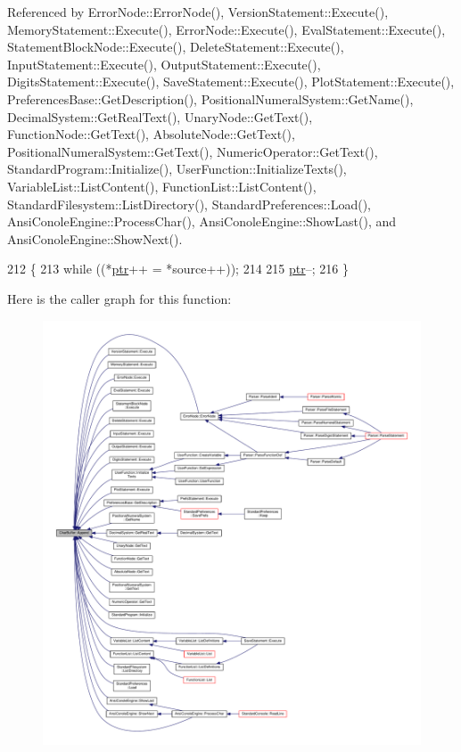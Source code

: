 Referenced by Error\+Node\+::\+Error\+Node(), Version\+Statement\+::\+Execute(), Memory\+Statement\+::\+Execute(), Error\+Node\+::\+Execute(), Eval\+Statement\+::\+Execute(), Statement\+Block\+Node\+::\+Execute(), Delete\+Statement\+::\+Execute(), Input\+Statement\+::\+Execute(), Output\+Statement\+::\+Execute(), Digits\+Statement\+::\+Execute(), Save\+Statement\+::\+Execute(), Plot\+Statement\+::\+Execute(), Preferences\+Base\+::\+Get\+Description(), Positional\+Numeral\+System\+::\+Get\+Name(), Decimal\+System\+::\+Get\+Real\+Text(), Unary\+Node\+::\+Get\+Text(), Function\+Node\+::\+Get\+Text(), Absolute\+Node\+::\+Get\+Text(), Positional\+Numeral\+System\+::\+Get\+Text(), Numeric\+Operator\+::\+Get\+Text(), Standard\+Program\+::\+Initialize(), User\+Function\+::\+Initialize\+Texts(), Variable\+List\+::\+List\+Content(), Function\+List\+::\+List\+Content(), Standard\+Filesystem\+::\+List\+Directory(), Standard\+Preferences\+::\+Load(), Ansi\+Conole\+Engine\+::\+Process\+Char(), Ansi\+Conole\+Engine\+::\+Show\+Last(), and Ansi\+Conole\+Engine\+::\+Show\+Next().


\begin{DoxyCode}
212 \{
213     \textcolor{keywordflow}{while} ((*\hyperlink{classCharBuffer_a2d313433650506fd6609e6947729dfb0}{ptr}++ = *source++));
214 
215     \hyperlink{classCharBuffer_a2d313433650506fd6609e6947729dfb0}{ptr}--;
216 \}
\end{DoxyCode}


Here is the caller graph for this function\+:
\nopagebreak
\begin{figure}[H]
\begin{center}
\leavevmode
\includegraphics[width=350pt]{dc/d84/classCharBuffer_a045b38735f7b3007c1b98d3d7b7feafe_icgraph}
\end{center}
\end{figure}


